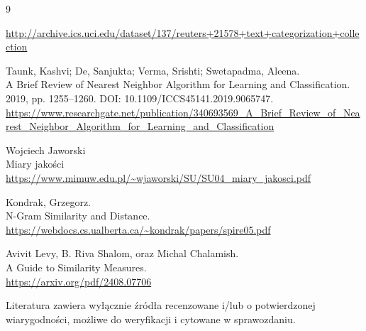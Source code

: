 \documentclass{article}
\begin{document}
\begin{thebibliography}{9}

\url{http://archive.ics.uci.edu/dataset/137/reuters+21578+text+categorization+collection}

Taunk, Kashvi; De, Sanjukta; Verma, Srishti; Swetapadma, Aleena.\\
A Brief Review of Nearest Neighbor Algorithm for Learning and Classification.
2019, pp. 1255--1260. DOI: 10.1109/ICCS45141.2019.9065747.\\
\url{https://www.researchgate.net/publication/340693569_A_Brief_Review_of_Nearest_Neighbor_Algorithm_for_Learning_and_Classification}

Wojciech Jaworski\\
Miary jakości\\
\url{https://www.mimuw.edu.pl/~wjaworski/SU/SU04_miary_jakosci.pdf}

Kondrak, Grzegorz.\\
N-Gram Similarity and Distance.\\
\url{https://webdocs.cs.ualberta.ca/~kondrak/papers/spire05.pdf}

Avivit Levy, B. Riva Shalom, oraz Michal Chalamish.\\
A Guide to Similarity Measures.\\
\url{https://arxiv.org/pdf/2408.07706}

\end{thebibliography}

Literatura zawiera wyłącznie źródła recenzowane i/lub o potwierdzonej wiarygodności,
możliwe do weryfikacji i cytowane w sprawozdaniu.
\end{document}
